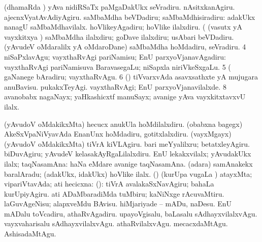 \noindent
\gl{\pagu}
\bmng
\bnum
{} (dhamaRda \vi) 
\banum
{} yAva nidiRSaTx paMgaDakUkx seVradiru. 
 nAsitxkanAgiru. 
 ajecnxVyatAvAdiyAgiru. 
\eanum
\numie
{}  
\banum
{} saMbaMdha beVDadiru; saMbaMdhisiradiru:  adakUkx nanagU saMbaMdhavilalx. 
 hoVlikeyAgadiru; hoVlike ilalxdiru. 
\eanum
\numie
{}  (  
\banum
{} (vasutx yA vayxkitxya \vi) saMbaMdha ilalxdiru; goDave ilalxdiru; usAbari beVDadiru. 
 (yAvudeV oMdaralilx yA oMdaroDane) saMbaMdha hoMdadiru, seVradiru. 
\eanum
\numie
\num{4}  niSaPxlavAgu; vayxthaRvAgi pariNamisu; EnU parxyoVjanavAgadiru:  vayxthaRvAgi pariNamisuva BaravasegaLu; niSapxla niriVkeSxgaLu. 
\num{5}  (  gaNanege bAradiru; vayxthaRvAgu. 
\num{6} (\AmA) tiVvarxvAda asavxsathxte yA mujugara anuBavisu. 
  
\banum
{} pukakxTeyAgi. 
 vayxthaRvAgi; EnU parxyoVjanavilalxde. 
\eanum
\numie
\num{8}  avanobabx nagaNayx; yaHkashicxtf manuSayx; avanige yAva vayxkitxtavxvU ilalx. 
  
\banum
{} (yAvudoV oMdakikxMta) hecucx anukUla hoMdilalxdiru. 
 (obabxna bagegx) AkeSxVpaNiVyavAda EnanUnx hoMdadiru, gotitxlalxdiru. 
 (vayxMgayx) (yAvudoV oMdakikxMta) tiVrA kiVLAgiru. 
 bari meYyalilxru; betatxleyAgiru. 
 biDuvAgiru; yAvudeV kelasakAyRgaLilalxdiru. 
\eanum
\numie
{}  
\banum
{} EnU lekakxvilalx; yAvudakUkx ilalx; taqNasamAna:  haNa eMdare avanige taqNasamAna. 
 (adara) samAnakekx baralAradu; (adakUkx, idakUkx) hoVlike ilalx. 
\eanum
\numie
{} (\AmA) (kurUpa \mo vugaLa \vi) atayxMta; vipariVtavAda; ati hecicxna: (\AmA): 
\banum
{} tiVrA avalakaSxNavAgiru; bahaLa kurUpiyAgiru. 
 ati ADaMbaradiMda tuMbiru; kaNiNxge rAcuvaMtiru. 
\eanum
\numie
{}  
\banum
{} laGuvAgeNisu; alapxveMdu BAvisu. 
 hiMjariyade -- mADu, naDesu. 
 EnU mADalu toVcadiru, athaRvAgadiru. 
 upayoVgisalu, baLasalu sAdhayxvilalxvAgu. 
 vayxvaharisalu sAdhayxvilalxvAgu. 
\eanum
\numie
{}  
\banum
{} athaRvilalxvAgu. 
 mecacxdaMtAgu. 
 AshisadaMtAgu. 
